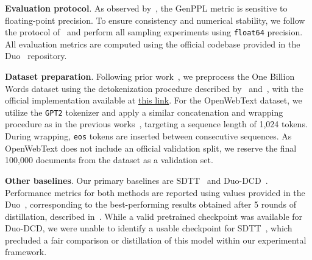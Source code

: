 \noindent \textbf{Evaluation protocol}. 
As observed by~\citep{zheng2024masked}, the GenPPL metric is sensitive to floating-point precision. To ensure consistency and numerical stability, we follow the protocol of~\citep{sahoo2025the} and perform all sampling experiments using \texttt{float64} precision. All evaluation metrics are computed using the official codebase provided in the Duo~\citep{sahoo2025the} repository.

\noindent \textbf{Dataset preparation}.
Following prior work~\citep{sahoo2024simple, sahoo2025the, lou2024discrete}, we preprocess the One Billion Words dataset using the detokenization procedure described by~\citet{lou2024discrete} and~\citet{sahoo2024simple}, with the official implementation available at \href{https://github.com/louaaron/Score-Entropy-Discrete-Diffusion/blob/main/data.py}{this link}. For the OpenWebText dataset, we utilize the \texttt{GPT2} tokenizer and apply a similar concatenation and wrapping procedure as in the previous works~\citep{sahoo2024simple, sahoo2025the}, targeting a sequence length of 1,024 tokens. During wrapping, \texttt{eos} tokens are inserted between consecutive sequences. As OpenWebText does not include an official validation split, we reserve the final 100{,}000 documents from the dataset as a validation set.

\noindent \textbf{Other baselines}.
Our primary baselines are SDTT~\citep{deschenaux2024beyond} and Duo-DCD~\citep{sahoo2025the}. Performance metrics for both methods are reported using values provided in the Duo~\citep{sahoo2025the}, corresponding to the best-performing results obtained after 5 rounds of distillation, described in~\citep{sahoo2025the}. While a valid pretrained checkpoint was available for Duo-DCD, we were unable to identify a usable checkpoint for SDTT~\citep{deschenaux2024beyond}, which precluded a fair comparison or distillation of this model within our experimental framework.